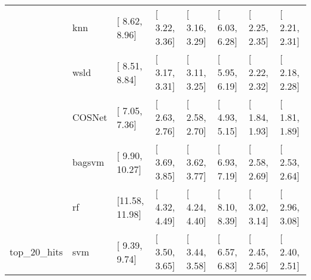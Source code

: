 \begin{table}[H]
{\begin{tabular}{llllllll}
 & knn & [ 8.62,  8.96] & [ 3.22,  3.36] & [ 3.16,  3.29] & [ 6.03,  6.28] & [ 2.25,  2.35] & [ 2.21,  2.31]\\

 & wsld & [ 8.51,  8.84] & [ 3.17,  3.31] & [ 3.11,  3.25] & [ 5.95,  6.19] & [ 2.22,  2.32] & [ 2.18,  2.28]\\

 & COSNet & [ 7.05,  7.36] & [ 2.63,  2.76] & [ 2.58,  2.70] & [ 4.93,  5.15] & [ 1.84,  1.93] & [ 1.81,  1.89]\\

 & bagsvm & [ 9.90, 10.27] & [ 3.69,  3.85] & [ 3.62,  3.77] & [ 6.93,  7.19] & [ 2.58,  2.69] & [ 2.53,  2.64]\\

 & rf & [11.58, 11.98] & [ 4.32,  4.49] & [ 4.24,  4.40] & [ 8.10,  8.39] & [ 3.02,  3.14] & [ 2.96,  3.08]\\

\multirow{-15}{*}{\raggedright\arraybackslash top\_20\_hits} & svm & [ 9.39,  9.74] & [ 3.50,  3.65] & [ 3.44,  3.58] & [ 6.57,  6.83] & [ 2.45,  2.56] & [ 2.40,  2.51]\\
\bottomrule
\end{tabular}}
\end{table}
